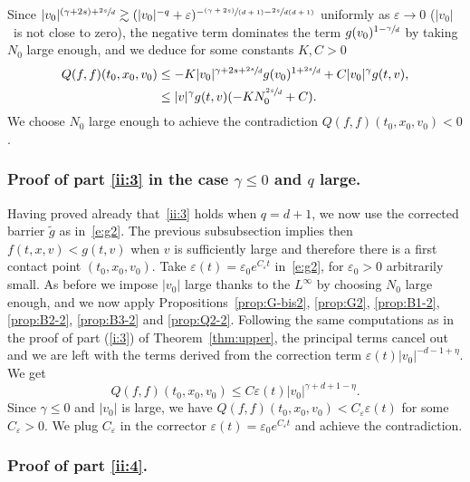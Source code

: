 \documentclass[JEP,XML,SOM,Unicode,NoFloatCountersInSection]{cedram}
\newcommand{\pspfrac}[2]{\sfrac{(#1)}{(#2)}}
\theoremstyle{plain}
\theoremstyle{definition}
\numberwithin{equation}{section}
\newcommand{\eps}{\varepsilon}
\newcommand{\Ao}{N_0}
\begin{document}
Since
$|v_0|^{(\gamma+2s)+\sfrac{2s}d} \gtrsim (|v_0|^{-q} +
\eps)^{-\pspfrac{\gamma+2s}{d+1} - \sfrac{2s}{d(d+1)}}$ uniformly as
$\eps \to 0$ ($|v_0|$~is not close to zero), the negative term
dominates the term $g(v_0)^{1-\sfrac{\gamma}{d}}$ by taking $\Ao$ large
enough, and we deduce for some constants $K,C>0$
\begin{align*}
Q(f,f)(t_0,x_0,v_0) &\leq -K |v_0|^{\gamma+2s+\sfrac{2s}d} g(v_0)^{1+\sfrac{2s}d} + C |v_0|^{\gamma} g(t,v), \\
&\leq |v|^{\gamma} g(t,v)( -K \Ao^{\sfrac{2s}d} + C).
\end{align*}
We choose $\Ao$ large enough to achieve the contradiction
$Q(f,f)(t_0,x_0,v_0) <0$.

\subsubsection{Proof of part \eqref{ii:3} in the case $\gamma \le 0$
and $q$ large.}

Having proved already that~\eqref{ii:3} holds when $q=d+1$, we now
use the corrected barrier $\tilde g$ as in~\eqref{e:g2}. The
previous subsubsection implies then $f(t,x,v) < g(t,v)$ when $v$ is
sufficiently large and therefore there is a first contact point
$(t_0,x_0,v_0)$. Take $\eps(t) = \eps_0e^{C_\eps t}$
in~\eqref{e:g2}, for $\eps_0>0$ arbitrarily small. As before we
impose $|v_0|$ large thanks to the $L^\infty$ by choosing $\Ao$
large enough, and we now apply Propositions~\ref{prop:G-bis2},
\ref{prop:G2}, \ref{prop:B1-2}, \ref{prop:B2-2}, \ref{prop:B3-2} and
\ref{prop:Q2-2}. Following the same computations as in the proof of
part (\ref{i:3}) of Theorem~\ref{thm:upper}, the principal terms
cancel out and we are left with the terms derived from the
correction term $\eps(t) |v_0|^{-d-1+\eta}$. We get
\[
Q(f,f)(t_0,x_0,v_0) \leq C \eps(t) |v_0|^{\gamma+d+1-\eta}.
\]
Since $\gamma\leq 0$ and $|v_0|$ is large, we have
$Q(f,f)(t_0,x_0,v_0) < C_\eps \eps(t)$ for some $C_\eps >0$. We
plug $C_\eps$ in the corrector
$\eps(t) = \eps_0 e^{C_\eps t}$ and achieve the contradiction.

\subsubsection{Proof of part \eqref{ii:4}.}
\end{document}
